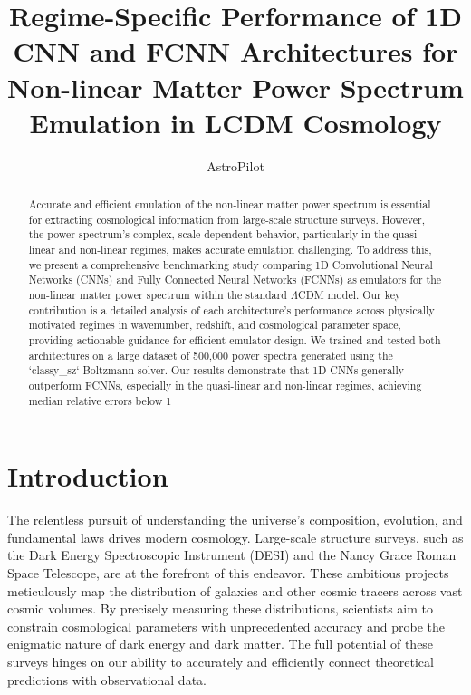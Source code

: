 \documentclass[twocolumn]{aastex631}
\begin{document}
\title{Regime-Specific Performance of 1D CNN and FCNN Architectures for Non-linear Matter Power Spectrum Emulation in LCDM Cosmology}

\author{AstroPilot}

\begin{abstract}
Accurate and efficient emulation of the non-linear matter power spectrum is essential for extracting cosmological information from large-scale structure surveys. However, the power spectrum's complex, scale-dependent behavior, particularly in the quasi-linear and non-linear regimes, makes accurate emulation challenging. To address this, we present a comprehensive benchmarking study comparing 1D Convolutional Neural Networks (CNNs) and Fully Connected Neural Networks (FCNNs) as emulators for the non-linear matter power spectrum within the standard \(\Lambda\)CDM model. Our key contribution is a detailed analysis of each architecture's performance across physically motivated regimes in wavenumber, redshift, and cosmological parameter space, providing actionable guidance for efficient emulator design. We trained and tested both architectures on a large dataset of 500,000 power spectra generated using the `classy_sz` Boltzmann solver. Our results demonstrate that 1D CNNs generally outperform FCNNs, especially in the quasi-linear and non-linear regimes, achieving median relative errors below 1%
\end{abstract}



\section{Introduction}
\label{sec:intro}





\noindent The relentless pursuit of understanding the universe's composition, evolution, and fundamental laws drives modern cosmology. Large-scale structure surveys, such as the Dark Energy Spectroscopic Instrument (DESI) and the Nancy Grace Roman Space Telescope, are at the forefront of this endeavor. These ambitious projects meticulously map the distribution of galaxies and other cosmic tracers across vast cosmic volumes. By precisely measuring these distributions, scientists aim to constrain cosmological parameters with unprecedented accuracy and probe the enigmatic nature of dark energy and dark matter. The full potential of these surveys hinges on our ability to accurately and efficiently connect theoretical predictions with observational data.
\end{document}
